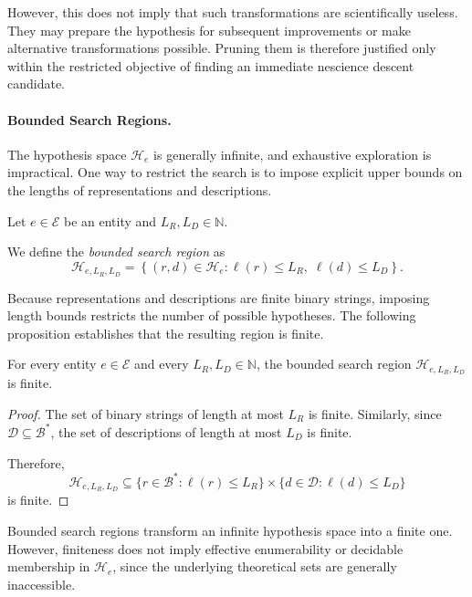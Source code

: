 However, this does not imply that such transformations
are scientifically useless. They may prepare the
hypothesis for subsequent improvements or make
alternative transformations possible. Pruning them
is therefore justified only within the restricted
objective of finding an immediate nescience
descent candidate.

\paragraph{Bounded Search Regions.}

The hypothesis space $\mathcal H_e$ is generally
infinite, and exhaustive exploration is impractical.
One way to restrict the search is to impose
explicit upper bounds on the lengths of
representations and descriptions.

\begin{definition}
Let $e\in\mathcal E$ be an entity and
$L_R,L_D\in\mathbb N$.

We define the \emph{bounded search region}
 as
\[
\mathcal H_{e,L_R,L_D}
=
\left\{
(r,d)\in\mathcal H_e:
\ell(r)\leq L_R,\;
\ell(d)\leq L_D
\right\}.
\]
\end{definition}

Because representations and descriptions are
finite binary strings, imposing length bounds
restricts the number of possible hypotheses.
The following proposition establishes that
the resulting region is finite.

\begin{proposition}
\label{prop:bounded_region_finite}
For every entity $e\in\mathcal E$ and every
$L_R,L_D\in\mathbb N$, the bounded search
region $\mathcal H_{e,L_R,L_D}$ is finite.
\end{proposition}

\begin{proof}
The set of binary strings of length at most
$L_R$ is finite. Similarly, since
$\mathcal D\subseteq\mathcal B^\ast$,
the set of descriptions of length at most
$L_D$ is finite.

Therefore,
\[
\mathcal H_{e,L_R,L_D}
\subseteq
\{r\in\mathcal B^\ast:\ell(r)\leq L_R\}
\times
\{d\in\mathcal D:\ell(d)\leq L_D\}
\]
is finite.
\end{proof}

Bounded search regions transform an infinite
hypothesis space into a finite one. However,
finiteness does not imply effective enumerability
or decidable membership in $\mathcal H_e$,
since the underlying theoretical sets are
generally inaccessible.

